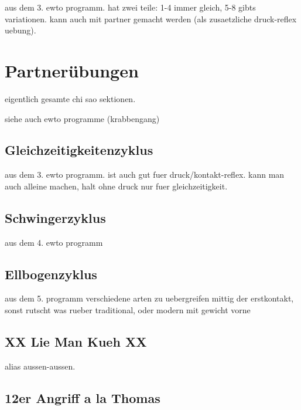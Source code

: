 aus dem 3. ewto programm.
hat zwei teile: 1-4 immer gleich, 5-8 gibts variationen.
kann auch mit partner gemacht werden (als zusaetzliche druck-reflex uebung).

\section{Partner\"ubungen}

eigentlich gesamte chi sao sektionen.

siehe auch ewto programme (krabbengang)


\subsection{Gleichzeitigkeitenzyklus}

aus dem 3. ewto programm.
ist auch gut fuer druck/kontakt-reflex.
kann man auch alleine machen, halt ohne druck nur fuer gleichzeitigkeit.

\subsection{Schwingerzyklus}

aus dem 4. ewto programm

\subsection{Ellbogenzyklus}

aus dem 5. programm
verschiedene arten zu uebergreifen
mittig der erstkontakt, sonst rutscht was rueber
traditional, oder modern mit gewicht vorne


\subsection{XX Lie Man Kueh XX}

alias aussen-aussen.

\subsection{12er Angriff a la Thomas}

